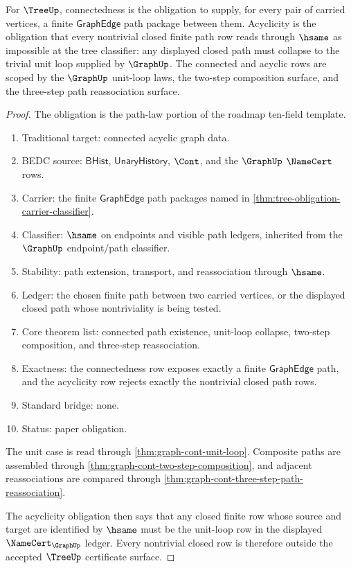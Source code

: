 \begin{theorem}
\label{thm:tree-obligation-connected-acyclic}
For $\TreeUp$, connectedness is the obligation to supply, for every pair of
carried vertices, a finite $\mathsf{GraphEdge}$ path package between them.
Acyclicity is the obligation that every nontrivial closed finite path row reads
through $\hsame$ as impossible at the tree classifier: any displayed closed
path must collapse to the trivial unit loop supplied by $\GraphUp$. The
connected and acyclic rows are scoped by the $\GraphUp$ unit-loop laws, the
two-step composition surface, and the three-step path reassociation surface.
\end{theorem}
\begin{proof}
The obligation is the path-law portion of the roadmap ten-field template.
\begin{enumerate}
  \item Traditional target: connected acyclic graph data.
  \item BEDC source: $\mathsf{BHist}$, $\mathsf{UnaryHistory}$, $\Cont$, and
  the $\GraphUp$ $\NameCert$ rows.
  \item Carrier: the finite $\mathsf{GraphEdge}$ path packages named in
  \autoref{thm:tree-obligation-carrier-classifier}.
  \item Classifier: $\hsame$ on endpoints and visible path ledgers, inherited
  from the $\GraphUp$ endpoint/path classifier.
  \item Stability: path extension, transport, and reassociation through
  $\hsame$.
  \item Ledger: the chosen finite path between two carried vertices, or the
  displayed closed path whose nontriviality is being tested.
  \item Core theorem list: connected path existence, unit-loop collapse,
  two-step composition, and three-step reassociation.
  \item Exactness: the connectedness row exposes exactly a finite
  $\mathsf{GraphEdge}$ path, and the acyclicity row rejects exactly the
  nontrivial closed path rows.
  \item Standard bridge: none.
  \item Status: paper obligation.
\end{enumerate}

The unit case is read through
\autoref{thm:graph-cont-unit-loop}. Composite paths are assembled through
\autoref{thm:graph-cont-two-step-composition}, and adjacent reassociations are
compared through \autoref{thm:graph-cont-three-step-path-reassociation}.

The acyclicity obligation then says that any closed finite row whose source and
target are identified by $\hsame$ must be the unit-loop row in the displayed
$\NameCert_{\GraphUp}$ ledger. Every nontrivial closed row is therefore outside
the accepted $\TreeUp$ certificate surface.
\end{proof}


